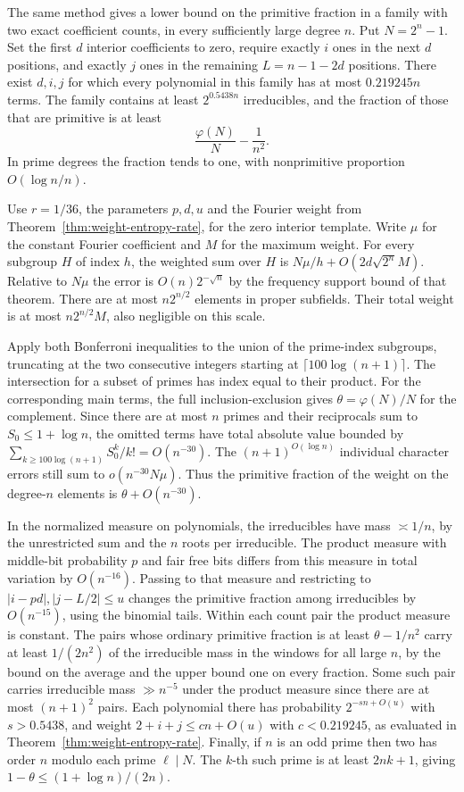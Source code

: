 \documentclass[11pt]{article}
\begin{document}
The same method gives a lower bound on the primitive fraction in a
family with two exact coefficient counts, in every sufficiently large
degree \(n\). Put \(N=2^n-1\). Set the first \(d\) interior coefficients
to zero, require exactly \(i\) ones in the next \(d\) positions, and
exactly \(j\) ones in the remaining \(L=n-1-2d\) positions. There exist
\(d,i,j\) for which every polynomial in this family has at most
\(0.219245n\) terms. The family contains at least \(2^{0.5438n}\)
irreducibles, and the fraction of those that are primitive is at least
\[
                     \frac{\varphi(N)}{N}-\frac{1}{n^2}.
\]
In prime degrees the fraction tends to one, with nonprimitive
proportion \(O(\log n/n)\).

Use \(r=1/36\), the parameters \(p,d,u\) and the Fourier weight
from Theorem~\ref{thm:weight-entropy-rate}, for the zero interior
template. Write \(\mu\) for the constant Fourier coefficient and
\(M\) for the maximum weight. For every subgroup \(H\) of index \(h\),
the weighted sum over \(H\) is \(N\mu/h+O(2d\sqrt{2^n}M)\).
Relative to \(N\mu\) the error is \(O(n)2^{-\sqrt n}\) by the
frequency support bound of that theorem. There are at most
\(n2^{n/2}\) elements in proper subfields. Their total weight is
at most \(n2^{n/2}M\), also negligible on this scale.

Apply both Bonferroni inequalities to the union of the prime-index
subgroups, truncating at the two consecutive integers starting at
\(\lceil100\log(n+1)\rceil\). The intersection for a subset of primes
has index equal to their product. For the corresponding main terms,
the full inclusion-exclusion gives \(\theta=\varphi(N)/N\) for the
complement. Since there are at most \(n\) primes and their reciprocals
sum to \(S_0\le1+\log n\), the omitted terms have total absolute value
bounded by \(\sum_{k\ge100\log(n+1)}S_0^k/k!=O(n^{-30})\).
The \((n+1)^{O(\log n)}\) individual character errors still sum to
\(o(n^{-30}N\mu)\). Thus the primitive fraction of the weight on the
degree-\(n\) elements is \(\theta+O(n^{-30})\).

In the normalized measure on polynomials, the irreducibles have mass
\(\asymp1/n\), by the unrestricted sum and the \(n\) roots per
irreducible. The product measure with middle-bit probability \(p\)
and fair free bits differs from this measure in total variation by
\(O(n^{-16})\). Passing to that measure and restricting to
\(|i-pd|,|j-L/2|\le u\) changes the primitive fraction among
irreducibles by \(O(n^{-15})\), using the binomial tails. Within each
count pair the product measure is constant. The pairs whose ordinary
primitive fraction is at least \(\theta-1/n^2\) carry at least
\(1/(2n^2)\) of the irreducible mass in the windows for all large
\(n\), by the bound on the average and the upper bound one on every
fraction. Some such pair carries irreducible mass \(\gg n^{-5}\)
under the product measure since there are at most \((n+1)^2\) pairs.
Each polynomial there has probability \(2^{-sn+O(u)}\) with
\(s>0.5438\), and weight \(2+i+j\le cn+O(u)\) with \(c<0.219245\),
as evaluated in Theorem~\ref{thm:weight-entropy-rate}.
Finally, if \(n\) is an odd prime then two has order \(n\) modulo
each prime \(\ell\mid N\). The \(k\)-th such prime is at least
\(2nk+1\), giving \(1-\theta\le(1+\log n)/(2n)\).
\end{document}
